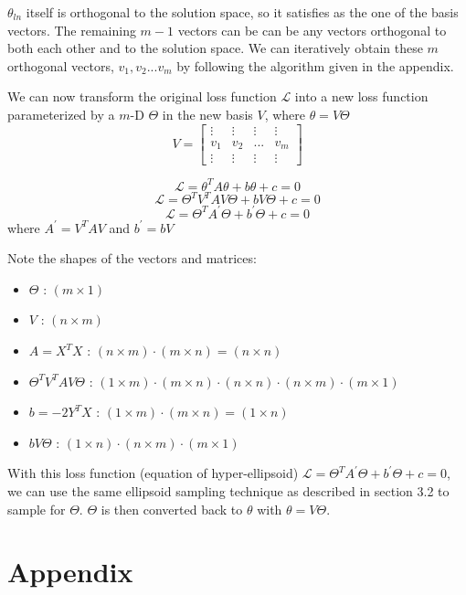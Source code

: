 \documentclass{article}
\begin{document}
$\theta_{ln}$ itself is orthogonal to the solution space, so it satisfies as the one of the basis vectors. The remaining $m-1$ vectors can be can be any vectors orthogonal to both each other and to the solution space. We can iteratively obtain these $m$ orthogonal vectors, $v_1, v_2 ... v_m$ by following the algorithm given in the appendix. 

We can now transform the original loss function $\mathcal{L}$ into a new loss function parameterized by a $m$-D $\Theta$ in the new basis $V$, where $\theta = V\Theta$
\[
V = 
\begin{bmatrix}
 \vdots & \vdots & \vdots & \vdots\\
 v_1 & v_2 & ... & v_m\\
 \vdots & \vdots & \vdots & \vdots
\end{bmatrix}
\]

\[
\mathcal{L} = \theta^T A\theta + b\theta + c = 0
\]
\[
\mathcal{L} = \Theta^T V^T A V \Theta + bV\Theta + c = 0
\]
\[
\mathcal{L} = \Theta^T A^{'} \Theta + b^{'}\Theta + c = 0
\]
where $A^{'} = V^T A V$ and $b^{'} = bV$

Note the shapes of the vectors and matrices:
\begin{itemize}
  \item $\Theta$ : $(m \times 1)$
  \item $V$ : $(n \times m)$
  \item $A = X^TX$ : $(n \times m)\cdot(m \times n) = (n \times n)$
  \item $\Theta^T V^T A V \Theta$ : $(1 \times m)\cdot(m \times n)\cdot(n \times n)\cdot(n \times m)\cdot(m \times 1)$
  \item $b = -2Y^TX$ : $(1 \times m)\cdot(m \times n) = (1 \times n)$
  \item $bV\Theta$ : $(1 \times n)\cdot(n \times m)\cdot(m \times 1)$
\end{itemize}

With this loss function (equation of hyper-ellipsoid) $\mathcal{L} = \Theta^T A^{'} \Theta + b^{'}\Theta + c = 0$, we can use the same ellipsoid sampling technique as described in section 3.2 to sample for $\Theta$. $\Theta$ is then converted back to $\theta$ with $\theta = V\Theta$.




\section*{Appendix}
\end{document}
